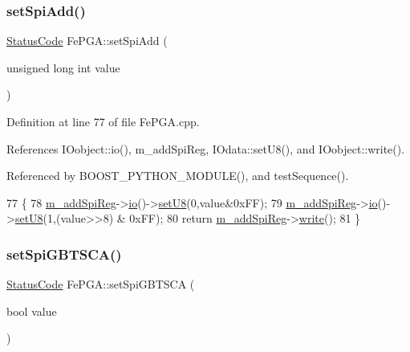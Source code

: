 \subsubsection{\texorpdfstring{set\+Spi\+Add()}{setSpiAdd()}}
{\footnotesize\ttfamily \hyperlink{classStatusCode}{Status\+Code} Fe\+P\+G\+A\+::set\+Spi\+Add (\begin{DoxyParamCaption}\item[{unsigned long int}]{value }\end{DoxyParamCaption})}



Definition at line 77 of file Fe\+P\+G\+A.\+cpp.



References I\+Oobject\+::io(), m\+\_\+add\+Spi\+Reg, I\+Odata\+::set\+U8(), and I\+Oobject\+::write().



Referenced by B\+O\+O\+S\+T\+\_\+\+P\+Y\+T\+H\+O\+N\+\_\+\+M\+O\+D\+U\+L\+E(), and test\+Sequence().


\begin{DoxyCode}
77                                                     \{
78   \hyperlink{classFePGA_a569eb8410924bec1c8279ca80dc37a6a}{m\_addSpiReg}->\hyperlink{classIOobject_af04fb94137c3d86849f478ac5afab5d1}{io}()->\hyperlink{classIOdata_a6c4fb2f2af01889ada889c2b7aceb24d}{setU8}(0,value&0xFF);
79   \hyperlink{classFePGA_a569eb8410924bec1c8279ca80dc37a6a}{m\_addSpiReg}->\hyperlink{classIOobject_af04fb94137c3d86849f478ac5afab5d1}{io}()->\hyperlink{classIOdata_a6c4fb2f2af01889ada889c2b7aceb24d}{setU8}(1,(value>>8) & 0xFF);
80   \textcolor{keywordflow}{return} \hyperlink{classFePGA_a569eb8410924bec1c8279ca80dc37a6a}{m\_addSpiReg}->\hyperlink{classIOobject_a9f6984bc9f0fadcf800f1be2523ac744}{write}();
81 \}
\end{DoxyCode}
\mbox{\label{classFePGA_a59b840619341df26918a6c26e8b8e72b}} 
\subsubsection{\texorpdfstring{set\+Spi\+G\+B\+T\+S\+C\+A()}{setSpiGBTSCA()}}
{\footnotesize\ttfamily \hyperlink{classStatusCode}{Status\+Code} Fe\+P\+G\+A\+::set\+Spi\+G\+B\+T\+S\+CA (\begin{DoxyParamCaption}\item[{bool}]{value }\end{DoxyParamCaption})}



